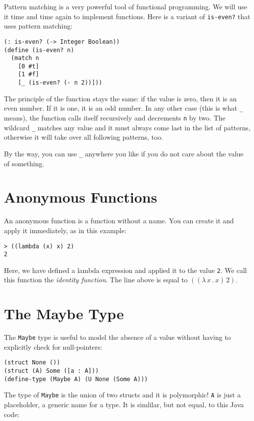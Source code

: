 \documentclass{article}
\begin{document}
Pattern matching is a very powerful tool of functional programming. We will use it time and time again to implement functions. Here is a variant of \lstinline{is-even?} that uses pattern matching:

\begin{lstlisting}
(: is-even? (-> Integer Boolean))
(define (is-even? n)
  (match n
    [0 #t]
    [1 #f]
    [_ (is-even? (- n 2))]))
\end{lstlisting}

The principle of the function stays the same: if the value is zero, then it is an even number. If it is one, it is an odd number. In any other case (this is what \lstinline{_} means), the function calls itself recursively and decrements \lstinline{n} by two. The wildcard \lstinline{_} matches any value and it must always come last in the list of patterns, otherwise it will take over all following patterns, too.

By the way, you can use \lstinline{_} anywhere you like if you do not care about the value of something.

\section{Anonymous Functions}

An anonymous function is a function without a name. You can create it and apply it immediately, as in this example:

\begin{lstlisting}
> ((lambda (x) x) 2)
2
\end{lstlisting}

Here, we have defined a lambda expression and applied it to the value \lstinline{2}. We call this function the \emph{identity function}. The line above is equal to $((\lambda\, x\, .\, x)\, 2)$.

\section{The Maybe Type}

The \lstinline{Maybe} type is useful to model the absence of a value without having to explicitly check for null-pointers:

\begin{lstlisting}
(struct None ())
(struct (A) Some ([a : A]))
(define-type (Maybe A) (U None (Some A)))
\end{lstlisting}

The type of \lstinline{Maybe} is the union of two structs and it is polymorphic! \lstinline{A} is just a placeholder, a generic name for a type. It is simlilar, but not equal, to this Java code:
\end{document}
